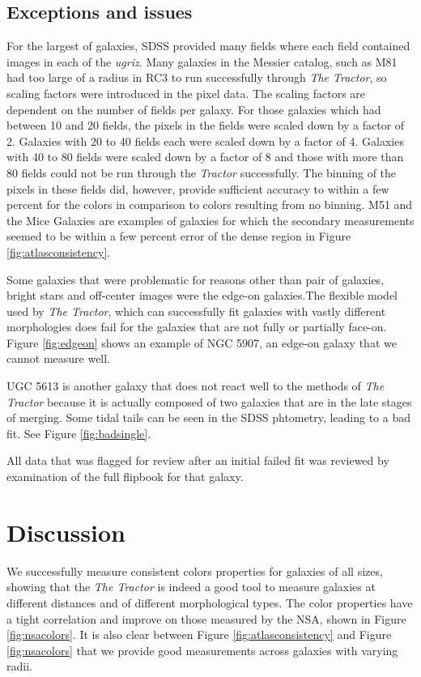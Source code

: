\documentclass[12pt,preprint,pdftex]{aastex}
\begin{document}
\subsection{Exceptions and issues}\label{sec:results}
For the largest of galaxies, SDSS provided many fields where each
field contained images in each of the \textit{ugriz}. Many galaxies in
the Messier catalog, such as M81 had too large of a radius in RC3 to
run successfully through \emph{The Tractor}, so scaling factors were
introduced in the pixel data. The scaling factors are dependent on the
number of fields per galaxy. For those galaxies which had between 10
and 20 fields, the pixels in the fields were scaled down by a factor
of 2. Galaxies with 20 to 40 fields each were scaled down by a factor
of 4. Galaxies with 40 to 80 fields were scaled down by a factor of 8
and those with more than 80 fields could not be run through the
\textit{Tractor} successfully. The binning of the pixels in these fields
did, however, provide sufficient accuracy to within a few percent for
the colors in comparison to colors resulting from no binning.
 M51 and the Mice Galaxies are examples of galaxies for which the
 secondary measurements seemed to be within a few percent error of the
 dense region in Figure \ref{fig:atlasconsistency}.

Some galaxies that were problematic for reasons other than pair of
galaxies, bright stars and off-center images were the edge-on
galaxies.The flexible model used by \emph{The Tractor}, which can
successfully fit galaxies with vastly different morphologies does fail
for the galaxies that are not fully or partially face-on. Figure
\ref{fig:edgeon} shows an example of NGC 5907, an edge-on galaxy that
we cannot measure well.
 
UGC 5613 is another galaxy that does not react well to the methods of
\emph{The Tractor} because it is actually composed of two galaxies
that are in the late stages of merging. Some tidal tails can be seen
in the SDSS phtometry, leading to a bad fit. See Figure
\ref{fig:badsingle}.

All data that was flagged for review after an initial failed fit was
reviewed by examination of the full flipbook for that galaxy.

\section{Discussion}\label{sec:discussion}
We successfully measure consistent colors properties for galaxies of
all sizes, showing that the \emph{The Tractor} is indeed a good tool
to measure galaxies at different distances and of different
morphological types. The color properties have a tight correlation and
improve on those measured by the NSA, shown in Figure
\ref{fig:nsacolors}. It is also clear between Figure
\ref{fig:atlasconsistency} and Figure \ref{fig:nsacolors} that we
provide good measurements across galaxies with varying radii.
\end{document}
